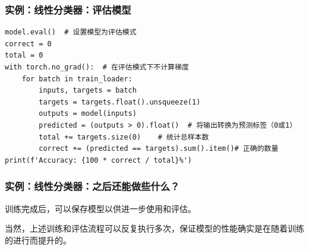 \begin{frame}[fragile]
    \frametitle{实例：线性分类器：评估模型}
    \begin{verbatim}
model.eval()  # 设置模型为评估模式
correct = 0
total = 0
with torch.no_grad():  # 在评估模式下不计算梯度
    for batch in train_loader:
        inputs, targets = batch
        targets = targets.float().unsqueeze(1)
        outputs = model(inputs)
        predicted = (outputs > 0).float()  # 将输出转换为预测标签（0或1）
        total += targets.size(0)    # 统计总样本数
        correct += (predicted == targets).sum().item()# 正确的数量
print(f'Accuracy: {100 * correct / total}%')  
    \end{verbatim}

\end{frame}

\begin{frame}[fragile]
    \frametitle{实例：线性分类器：之后还能做些什么？}
    
    训练完成后，可以保存模型以供进一步使用和评估。

    当然，上述训练和评估流程可以反复执行多次，保证模型的性能确实是在随着训练的进行而提升的。

\end{frame}
